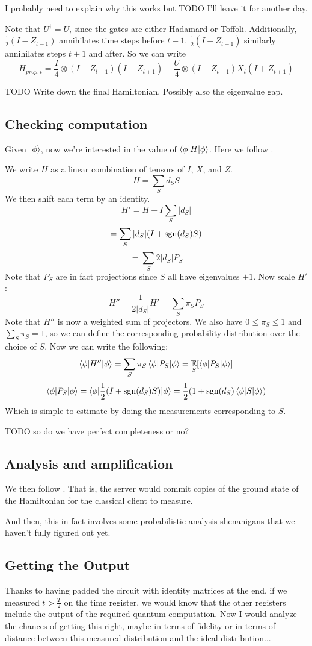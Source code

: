 I probably need to explain why this works but TODO I'll leave it for another day.

Note that $U^\dagger=U$, since the gates are either Hadamard or Toffoli. Additionally, $\frac{1}{2}(I-Z_{t-1})$ annihilates time steps before $t-1$. $\frac{1}{2}(I+Z_{t+1})$ similarly annihilates steps $t+1$ and after.
So we can write
$$H_{prop,t}=\frac{I}{4}\otimes(I-Z_{t-1})(I+Z_{t+1})-\frac{U}{4}\otimes(I-Z_{t-1})X_t(I+Z_{t+1})$$

TODO Write down the final Hamiltonian. Possibly also the eigenvalue gap.

\subsection{Checking computation}

Given $\ket\phi$, now we're interested in the value of $\braket{\phi|H|\phi}$. Here we follow \cite{PhysRevA.93.022326}.

We write $H$ as a linear combination of tensors of $I$, $X$, and $Z$.
$$H=\sum_S d_S S$$
We then shift each term by an identity.
$$H'=H+I\sum_S|d_S|$$
$$=\sum_S|d_S|(I+\operatorname{sgn}(d_S)S)$$
$$=\sum_S2|d_S|P_S$$
Note that $P_S$ are in fact projections since $S$ all have eigenvalues $\pm1$. Now scale $H'$:
$$H''=\frac{1}{2|d_S|}H'=\sum_S\pi_S P_S$$
Note that $H''$ is now a weighted sum of projectors. We also have $0\leq\pi_S\leq1$ and $\sum_S \pi_S=1$, so we can define the corresponding probability distribution over the choice of $S$. Now we can write the following:
$$\braket{\phi|H''|\phi}=\sum_S\pi_S\braket{\phi|P_S|\phi}=\operatorname*{\mathbb{E}}_S[\braket{\phi|P_S|\phi}]$$
$$\braket{\phi|P_S|\phi}=\braket{\phi|\frac{1}{2}(I+\operatorname{sgn}(d_S)S)|\phi}=\frac{1}{2}(1+\operatorname{sgn}(d_S)\braket{\phi|S|\phi})$$
Which is simple to estimate by doing the measurements corresponding to $S$.

TODO so do we have perfect completeness or no?

\subsection{Analysis and amplification}

We then follow \cite{mahadev_delegation}. That is, the server would commit copies of the ground state of the Hamiltonian for the classical client to measure.

And then, this in fact involves some probabilistic analysis shenanigans that we haven't fully figured out yet.

\subsection{Getting the Output}

Thanks to having padded the circuit with identity matrices at the end, if we measured $t>\frac{T}{2}$ on the time register, we would know that the other registers include the output of the required quantum computation. Now I would analyze the chances of getting this right, maybe in terms of fidelity or in terms of distance between this measured distribution and the ideal distribution...


